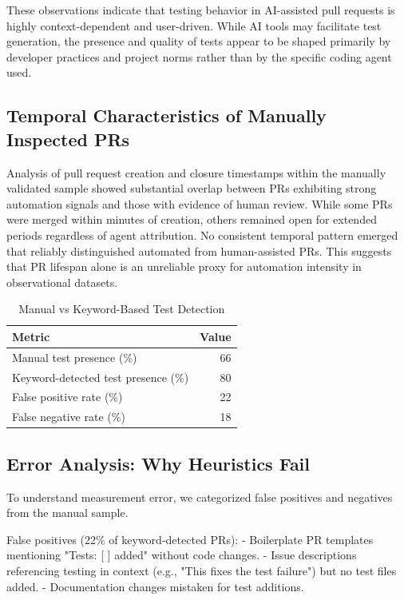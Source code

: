 \documentclass[conference]{IEEEtran}
\begin{document}
These observations indicate that testing behavior in AI-assisted pull requests is highly context-dependent and user-driven. While AI tools may facilitate test generation, the presence and quality of tests appear to be shaped primarily by developer practices and project norms rather than by the specific coding agent used.

\subsection{Temporal Characteristics of Manually Inspected PRs}

Analysis of pull request creation and closure timestamps within the manually validated sample showed substantial overlap between PRs exhibiting strong automation signals and those with evidence of human review. While some PRs were merged within minutes of creation, others remained open for extended periods regardless of agent attribution. No consistent temporal pattern emerged that reliably distinguished automated from human-assisted PRs. This suggests that PR lifespan alone is an unreliable proxy for automation intensity in observational datasets.

\begin{table}[t]
\centering
\caption{Manual vs Keyword-Based Test Detection}\label{tab:test_detection}
\begin{tabular}{@{}lr@{}}
\toprule
\textbf{Metric} & \textbf{Value} \\
\midrule
Manual test presence (\%) & 66 \\
Keyword-detected test presence (\%) & 80 \\
False positive rate (\%) & 22 \\
False negative rate (\%) & 18 \\
\bottomrule
\end{tabular}
\end{table}

\subsection{Error Analysis: Why Heuristics Fail}
To understand measurement error, we categorized false positives and negatives from the manual sample.

False positives (22\% of keyword-detected PRs):
- Boilerplate PR templates mentioning "Tests: [ ] added" without code changes.
- Issue descriptions referencing testing in context (e.g., "This fixes the test failure") but no test files added.
- Documentation changes mistaken for test additions.
\end{document}
